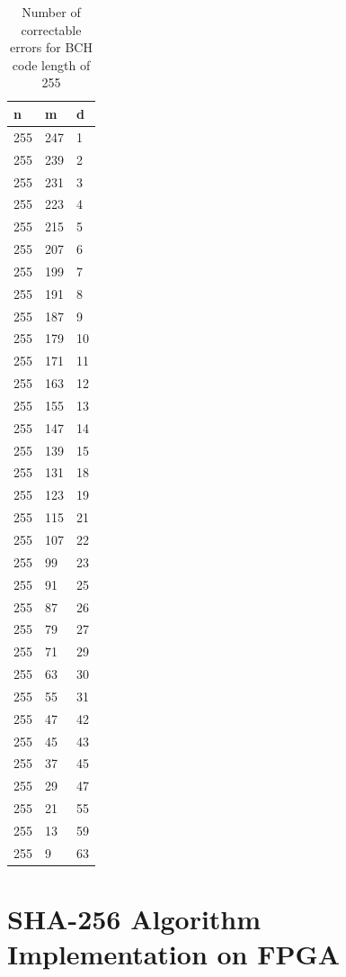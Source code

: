 \begin{table}
\begin{tabular}{lll}
\hline
n   &   m &   d \\ \hline
255 & 247 &   1 \\
255 & 239 &   2 \\
255 & 231 &   3 \\
255 & 223 &   4 \\
255 & 215 &   5 \\
255 & 207 &   6 \\
255 & 199 &   7 \\
255 & 191 &   8 \\
255 & 187 &   9 \\
255 & 179 &  10 \\
255 & 171 &  11 \\
255 & 163 &  12 \\
255 & 155 &  13 \\
255 & 147 &  14 \\
255 & 139 &  15 \\
255 & 131 &  18 \\
255 & 123 &  19 \\
255 & 115 &  21 \\
255 & 107 &  22 \\
255 &  99 &  23 \\
255 &  91 &  25 \\
255 &  87 &  26 \\
255 &  79 &  27 \\
255 &  71 &  29 \\
255 &  63 &  30 \\
255 &  55 &  31 \\
255 &  47 &  42 \\
255 &  45 &  43 \\
255 &  37 &  45 \\
255 &  29 &  47 \\
255 &  21 &  55 \\
255 &  13 &  59 \\
255 &   9 &  63 \\
\end{tabular}
\caption{Number of correctable errors for BCH code length of 255}
\label{tab:bch255}
\end{table}


\section{SHA-256 Algorithm Implementation on FPGA}
\label{sec:hash}

